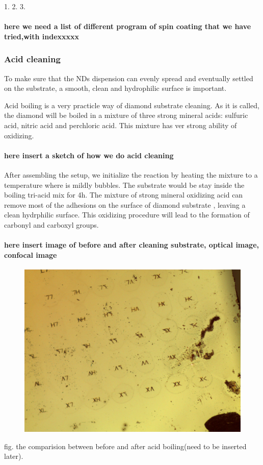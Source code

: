 1. 
2.
3.

\paragraph{here we need a list of different program of spin coating that we have tried,with indexxxxx}

\subsubsection{Acid cleaning}
To make sure that the NDs dispension can evenly spread and eventually settled on the substrate, a smooth, clean and hydrophilic surface is important.

Acid boiling is a very practicle way of diamond substrate cleaning. As it is called, the diamond will be boiled in a mixture of three strong mineral acids: sulfuric acid, nitric acid and perchloric acid. This mixture has ver strong ability of oxidizing.

\paragraph{here insert a sketch of how we do acid cleaning} 

After assembling the setup, we initialize the reaction by heating the mixture to a temperature where is mildly bubbles. The substrate would be stay inside the boiling tri-acid mix for 4h. 
The mixture of strong mineral oxidizing acid can remove most of the adhesions on the surface of diamond substrate , leaving a clean hydrphilic surface. This oxidizing procedure will lead to the formation of carbonyl and carboxyl groups.




\paragraph {here insert image of before and after cleaning substrate, optical image, confocal image }
\FloatBarrier
\begin{figure}[h]
\centering
\includegraphics[width=0.7\linewidth]{Figures/pic/image470}
\caption{}
\label{fig:image470}
\end{figure}
\FloatBarrier
fig. the comparision between before and after acid boiling(need to be inserted later).
 

